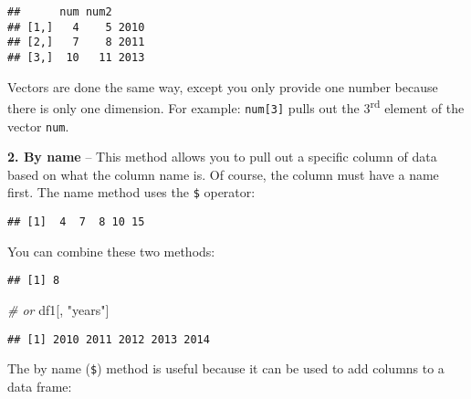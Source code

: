 \documentclass[]{book}
\newenvironment{Shaded}{\begin{snugshade}}{\end{snugshade}}
\newcommand{\KeywordTok}[1]{\textcolor[rgb]{0.13,0.29,0.53}{\textbf{#1}}}
\newcommand{\DecValTok}[1]{\textcolor[rgb]{0.00,0.00,0.81}{#1}}
\newcommand{\StringTok}[1]{\textcolor[rgb]{0.31,0.60,0.02}{#1}}
\newcommand{\CommentTok}[1]{\textcolor[rgb]{0.56,0.35,0.01}{\textit{#1}}}
\newcommand{\OperatorTok}[1]{\textcolor[rgb]{0.81,0.36,0.00}{\textbf{#1}}}
\newcommand{\NormalTok}[1]{#1}
\theoremstyle{definition}
\theoremstyle{definition}
\theoremstyle{definition}
\theoremstyle{remark}
\begin{document}
\begin{verbatim}
##      num num2     
## [1,]   4    5 2010
## [2,]   7    8 2011
## [3,]  10   11 2013
\end{verbatim}

Vectors are done the same way, except you only provide one number
because there is only one dimension. For example: \texttt{num{[}3{]}}
pulls out the 3\textsuperscript{rd} element of the vector \texttt{num}.

\textbf{2. By name} -- This method allows you to pull out a specific
column of data based on what the column name is. Of course, the column
must have a name first. The name method uses the \texttt{\$} operator:

\begin{Shaded}
\end{Shaded}

\begin{verbatim}
## [1]  4  7  8 10 15
\end{verbatim}

You can combine these two methods:

\begin{Shaded}
\end{Shaded}

\begin{verbatim}
## [1] 8
\end{verbatim}

\begin{Shaded}
\begin{Highlighting}[]
\CommentTok{# or}
\NormalTok{df1[, }\StringTok{"years"}\NormalTok{]}
\end{Highlighting}
\end{Shaded}

\begin{verbatim}
## [1] 2010 2011 2012 2013 2014
\end{verbatim}

The by name (\texttt{\$}) method is useful because it can be used to add
columns to a data frame:

\begin{Shaded}
\end{Shaded}
\end{document}
